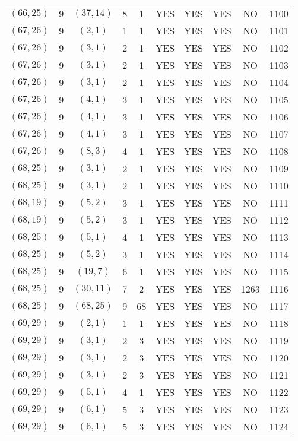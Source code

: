 \begin{longtable}{|c|c|c|c|c|c|c|c|c|c|}
$(66, 25)$ & 9 & $(37, 14)$ & 8 & 1 & YES & YES & YES & NO & 1100\\
$(67, 26)$ & 9 & $(2, 1)$ & 1 & 1 & YES & YES & YES & NO & 1101\\
$(67, 26)$ & 9 & $(3, 1)$ & 2 & 1 & YES & YES & YES & NO & 1102\\
$(67, 26)$ & 9 & $(3, 1)$ & 2 & 1 & YES & YES & YES & NO & 1103\\
$(67, 26)$ & 9 & $(3, 1)$ & 2 & 1 & YES & YES & YES & NO & 1104\\
$(67, 26)$ & 9 & $(4, 1)$ & 3 & 1 & YES & YES & YES & NO & 1105\\
$(67, 26)$ & 9 & $(4, 1)$ & 3 & 1 & YES & YES & YES & NO & 1106\\
$(67, 26)$ & 9 & $(4, 1)$ & 3 & 1 & YES & YES & YES & NO & 1107\\
$(67, 26)$ & 9 & $(8, 3)$ & 4 & 1 & YES & YES & YES & NO & 1108\\
$(68, 25)$ & 9 & $(3, 1)$ & 2 & 1 & YES & YES & YES & NO & 1109\\
$(68, 25)$ & 9 & $(3, 1)$ & 2 & 1 & YES & YES & YES & NO & 1110\\
$(68, 19)$ & 9 & $(5, 2)$ & 3 & 1 & YES & YES & YES & NO & 1111\\
$(68, 19)$ & 9 & $(5, 2)$ & 3 & 1 & YES & YES & YES & NO & 1112\\
$(68, 25)$ & 9 & $(5, 1)$ & 4 & 1 & YES & YES & YES & NO & 1113\\
$(68, 25)$ & 9 & $(5, 2)$ & 3 & 1 & YES & YES & YES & NO & 1114\\
$(68, 25)$ & 9 & $(19, 7)$ & 6 & 1 & YES & YES & YES & NO & 1115\\
$(68, 25)$ & 9 & $(30, 11)$ & 7 & 2 & YES & YES & YES & 1263 & 1116\\
$(68, 25)$ & 9 & $(68, 25)$ & 9 & 68 & YES & YES & YES & NO & 1117\\
$(69, 29)$ & 9 & $(2, 1)$ & 1 & 1 & YES & YES & YES & NO & 1118\\
$(69, 29)$ & 9 & $(3, 1)$ & 2 & 3 & YES & YES & YES & NO & 1119\\
$(69, 29)$ & 9 & $(3, 1)$ & 2 & 3 & YES & YES & YES & NO & 1120\\
$(69, 29)$ & 9 & $(3, 1)$ & 2 & 3 & YES & YES & YES & NO & 1121\\
$(69, 29)$ & 9 & $(5, 1)$ & 4 & 1 & YES & YES & YES & NO & 1122\\
$(69, 29)$ & 9 & $(6, 1)$ & 5 & 3 & YES & YES & YES & NO & 1123\\
$(69, 29)$ & 9 & $(6, 1)$ & 5 & 3 & YES & YES & YES & NO & 1124\\

\end{longtable}
